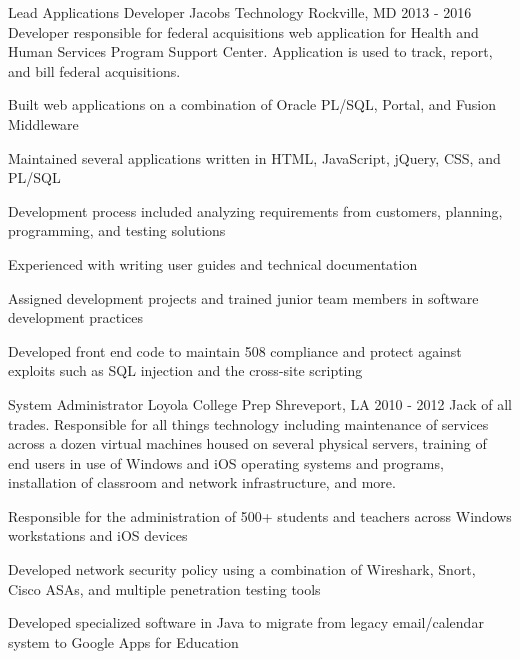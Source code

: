 \begin{cventries}
  \cventry
    {Lead Applications Developer} %
    {Jacobs Technology} %
    {Rockville, MD} %
    {2013 - 2016} %
    {Developer responsible for federal acquisitions web application for Health and Human Services Program Support Center. Application is used to track, report, and bill federal acquisitions.} %
    {
      \begin{cvitems} %
        \item {Built web applications on a combination of Oracle PL/SQL, Portal, and Fusion Middleware}
        \item {Maintained several applications written in HTML, JavaScript, jQuery, CSS, and PL/SQL}
        \item {Development process included analyzing requirements from customers, planning, programming, and testing solutions}
        \item {Experienced with writing user guides and technical documentation}
        \item {Assigned development projects and trained junior team members in software development practices}
        \item {Developed front end code to maintain 508 compliance and protect against exploits such as SQL injection and the cross-site scripting}
      \end{cvitems}
    }

  \cventry
    {System Administrator} %
    {Loyola College Prep} %
    {Shreveport, LA} %
    {2010 - 2012} %
    {Jack of all trades.  Responsible for all things technology including maintenance of services across a dozen virtual machines housed on several physical servers, training of end users in use of Windows and iOS operating systems and programs, installation of classroom and network infrastructure, and more.} %
    {
      \begin{cvitems} %
        \item {Responsible for the administration of 500+ students and teachers across Windows workstations and iOS devices}
        \item {Developed network security policy using a combination of Wireshark, Snort, Cisco ASAs, and multiple penetration testing tools}
        \item {Developed specialized software in Java to migrate from legacy email/calendar system to Google Apps for Education}
      \end{cvitems}
    }

\end{cventries}
